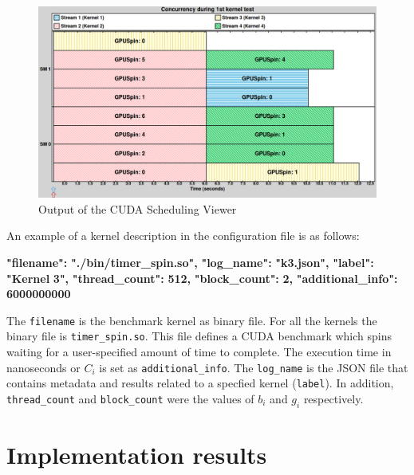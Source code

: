 \documentclass[
  12pt,
  a4paperpaper,
]{report}
\newenvironment{Shaded}{}{}
\newcommand{\ErrorTok}[1]{\textcolor[rgb]{1.00,0.00,0.00}{\textbf{#1}}}
\begin{document}
\begin{figure}
\centering
\includegraphics{source/figures/nvidia/base.png}
\caption{Output of the CUDA Scheduling Viewer \label{img:nvidia-base}}
\end{figure}

An example of a kernel description in the configuration file is as
follows:

\begin{Shaded}
\begin{Highlighting}[]
      \ErrorTok{"filename":} \ErrorTok{"./bin/timer\_spin.so",}
      \ErrorTok{"log\_name":} \ErrorTok{"k3.json",}
      \ErrorTok{"label":} \ErrorTok{"Kernel} \ErrorTok{3",}
      \ErrorTok{"thread\_count":} \ErrorTok{512,}
      \ErrorTok{"block\_count":} \ErrorTok{2,}
      \ErrorTok{"additional\_info":} \ErrorTok{6000000000}
\end{Highlighting}
\end{Shaded}

The \texttt{filename} is the benchmark kernel as binary file.
For all the kernels the binary file is \texttt{timer\_spin.so}. This file defines a
CUDA benchmark which spins waiting for a user-specified
amount of time to complete. The execution time in nanoseconds or \(C_i\)
is set as \texttt{additional\_info}. The \texttt{log\_name} is the
JSON file that contains metadata and results related to a specfied
kernel (\texttt{label}). In addition, \texttt{thread\_count} and
\texttt{block\_count} were the values of \(b_i\) and \(g_i\)
respectively.

\hypertarget{implementation-results}{%
\section{Implementation results}\label{implementation-results}}
\end{document}

